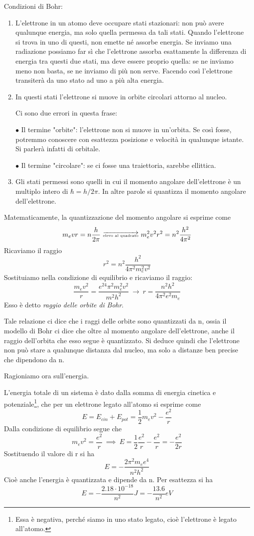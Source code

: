 Condizioni di Bohr:
\begin{enumerate}
  \item L'elettrone in un atomo deve occupare stati stazionari: non può avere qualunque energia, ma solo quella permessa da tali stati. Quando l'elettrone si trova in uno di questi, non emette né assorbe energia. Se inviamo una radiazione possiamo far sì che l'elettrone assorba esattamente la differenza di energia tra questi due stati, ma deve essere proprio quella: se ne inviamo meno non basta, se ne inviamo di più non serve.
  Facendo così l'elettrone transiterà da uno stato ad uno a più alta energia.
  \item In questi stati l'elettrone si muove in orbite circolari attorno al nucleo.
  
  Ci sono due errori in questa frase:

  $\bullet$ Il termine "orbite": l'elettrone non si muove in un'orbita. Se così fosse, potremmo conoscere con esattezza posizione e velocità in qualunque istante. Si parlerà infatti di orbitale.

  $\bullet$ Il termine "circolare": se ci fosse una traiettoria, sarebbe ellittica.
  \item Gli stati permessi sono quelli in cui il momento angolare dell'elettrone è un multiplo intero di $\hbar=h/2\pi$. In altre parole si quantizza il momento angolare dell'elettrone. 
\end{enumerate}
Matematicamente, la quantizzazione del momento angolare si esprime come
$$m_evr=n\frac{h}{2\pi}\ \overrightarrow{\text{\tiny{elevo al quadrato}}}\ m_e^2v^2r^2=n^2\frac{h^2}{4\pi^2}$$
Ricaviamo il raggio
$$r^2=n^2\frac{h^2}{4\pi^2m_e^2v^2}$$
Sostituiamo nella condizione di equilibrio e ricaviamo il raggio:
$$\frac{m_ev^2}{r}=\frac{e^24\pi^2m_e^2v^2}{m^2h^2}\ \rightarrow\ r=\frac{n^2h^2}{4\pi^2e^2m_e}$$
Esso è detto \textit{raggio delle orbite di Bohr}.

Tale relazione ci dice che i raggi delle orbite sono quantizzati da n, ossia il modello di Bohr ci dice che oltre al momento angolare dell'elettrone, anche il raggio dell'orbita che esso segue è quantizzato. Si deduce quindi che l'elettrone non può stare a qualunque distanza dal nucleo, ma solo a distanze ben precise che dipendono da n.

\vspace{0.2cm}Ragioniamo ora sull'energia.

L'energia totale di un sistema è dato dalla somma di energia cinetica e potenziale\footnote{Essa è negativa, perché siamo in uno stato legato, cioè l'elettrone è legato all'atomo.}, che per un elettrone legato all'atomo si esprime come
$$E=E_{cin} + E_{pot}=\frac{1}{2}m_ev^2 - \frac{e^2}{r}$$
Dalla condizione di equilibrio segue che
$$m_ev^2=\frac{e^2}{r}\ \implies\ E=\frac{1}{2}\frac{e^2}{r} - \frac{e^2}{r}=- \frac{e^2}{2r}$$
Sostituendo il valore di r si ha
$$E=-\frac{2\pi^2m_ee^4}{n^2h^2}$$
Cioè anche l'energia è quantizzata e dipende da n. Per esattezza si ha
$$E=-\frac{2.18\cdot10^{-18}}{n^2}J=-\frac{13.6}{n^2}eV$$

